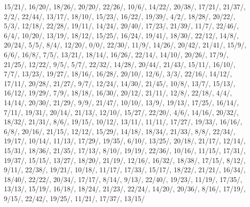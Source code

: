 15/21/{}, 16/20/{}, 18/26/{}, 20/20/{}, 22/26/{}, 10/6/{}, 14/22/{}, 20/38/{}, 17/21/{}, 21/37/{}, 2/2/{}, 22/44/{}, 13/17/{}, 18/10/{}, 15/23/{}, 16/22/{}, 19/39/{}, 4/2/{}, 18/28/{}, 20/22/{}, 5/3/{}, 12/18/{}, 22/28/{}, 19/11/{}, 14/24/{}, 20/40/{}, 17/23/{}, 21/39/{}, 11/7/{}, 22/46/{}, 6/4/{}, 10/20/{}, 13/19/{}, 18/12/{}, 15/25/{}, 16/24/{}, 19/41/{}, 18/30/{}, 22/12/{}, 14/8/{}, 20/24/{}, 5/5/{}, 8/4/{}, 12/20/{}, 0/0/{}, 22/30/{}, 11/9/{}, 14/26/{}, 20/42/{}, 21/41/{}, 15/9/{}, 6/6/{}, 16/8/{}, 7/5/{}, 13/21/{}, 18/14/{}, 16/26/{}, 22/14/{}, 14/10/{}, 20/26/{}, 17/9/{}, 21/25/{}, 12/22/{}, 9/5/{}, 5/7/{}, 22/32/{}, 14/28/{}, 20/44/{}, 21/43/{}, 15/11/{}, 16/10/{}, 7/7/{}, 13/23/{}, 19/27/{}, 18/16/{}, 16/28/{}, 20/10/{}, 12/6/{}, 3/3/{}, 22/16/{}, 14/12/{}, 17/11/{}, 20/28/{}, 21/27/{}, 9/7/{}, 12/24/{}, 14/30/{}, 21/45/{}, 10/8/{}, 13/7/{}, 15/13/{}, 16/12/{}, 19/29/{}, 7/9/{}, 18/18/{}, 16/30/{}, 20/12/{}, 21/11/{}, 12/8/{}, 22/18/{}, 4/4/{}, 14/14/{}, 20/30/{}, 21/29/{}, 9/9/{}, 21/47/{}, 10/10/{}, 13/9/{}, 19/13/{}, 17/25/{}, 16/14/{}, 7/11/{}, 19/31/{}, 20/14/{}, 21/13/{}, 12/10/{}, 15/27/{}, 22/20/{}, 4/6/{}, 14/16/{}, 20/32/{}, 18/32/{}, 21/31/{}, 8/6/{}, 19/15/{}, 10/12/{}, 13/11/{}, 11/11/{}, 17/27/{}, 19/33/{}, 16/16/{}, 6/8/{}, 20/16/{}, 21/15/{}, 12/12/{}, 15/29/{}, 14/18/{}, 18/34/{}, 21/33/{}, 8/8/{}, 22/34/{}, 19/17/{}, 10/14/{}, 11/13/{}, 17/29/{}, 19/35/{}, 6/10/{}, 13/25/{}, 20/18/{}, 21/17/{}, 12/14/{}, 15/31/{}, 18/36/{}, 21/35/{}, 17/13/{}, 8/10/{}, 19/19/{}, 22/36/{}, 10/16/{}, 11/15/{}, 17/31/{}, 19/37/{}, 15/15/{}, 13/27/{}, 18/20/{}, 21/19/{}, 12/16/{}, 16/32/{}, 18/38/{}, 17/15/{}, 8/12/{}, 9/11/{}, 22/38/{}, 19/21/{}, 10/18/{}, 11/17/{}, 17/33/{}, 15/17/{}, 18/22/{}, 21/21/{}, 16/34/{}, 18/40/{}, 22/22/{}, 20/34/{}, 17/17/{}, 8/14/{}, 9/13/{}, 22/40/{}, 19/23/{}, 11/19/{}, 17/35/{}, 13/13/{}, 15/19/{}, 16/18/{}, 18/24/{}, 21/23/{}, 22/24/{}, 14/20/{}, 20/36/{}, 8/16/{}, 17/19/{}, 9/15/{}, 22/42/{}, 19/25/{}, 11/21/{}, 17/37/{}, 13/15/{}